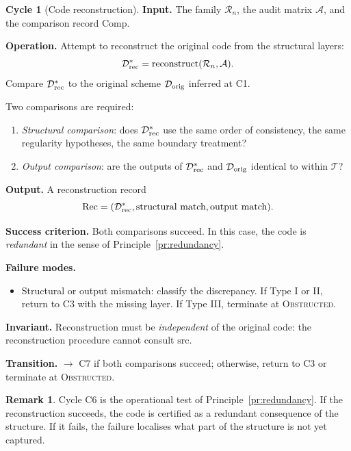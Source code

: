 \documentclass[11pt,a4paper]{article}
\theoremstyle{definition}
\newtheorem{cycle}{Cycle}[section]
\newtheorem{remark}[definition]{Remark}
\theoremstyle{plain}
\newcommand{\Rcal}{\mathcal{R}}
\newcommand{\Acal}{\mathcal{A}}
\newcommand{\Dcal}{\mathcal{D}}
\newcommand{\STOBSTR}{\textsc{Obstructed}}
\begin{document}
\begin{cycle}[Code reconstruction]\label{cy:c6}
\textbf{Input.} The family $\Rcal_n$, the audit matrix $\Acal$, and
the comparison record $\mathrm{Comp}$.

\medskip
\textbf{Operation.} Attempt to reconstruct the original code from
the structural layers:
\[
  \Dcal^\ast_{\rm rec} = \text{reconstruct}(\Rcal_n, \Acal).
\]
Compare $\Dcal^\ast_{\rm rec}$ to the original scheme
$\Dcal_{\rm orig}$ inferred at C1.

Two comparisons are required:
\begin{enumerate}[label=\arabic*.]
  \item \emph{Structural comparison}: does
        $\Dcal^\ast_{\rm rec}$ use the same order of consistency,
        the same regularity hypotheses, the same boundary treatment?
  \item \emph{Output comparison}: are the outputs of
        $\Dcal^\ast_{\rm rec}$ and $\Dcal_{\rm orig}$ identical to
        within $\mathcal{T}$?
\end{enumerate}

\medskip
\textbf{Output.} A reconstruction record
\[
  \mathrm{Rec} = (\Dcal^\ast_{\rm rec},
    \text{structural match}, \text{output match}).
\]

\medskip
\textbf{Success criterion.} Both comparisons succeed. In this
case, the code is \emph{redundant} in the sense of
Principle~\ref{pr:redundancy}.

\medskip
\textbf{Failure modes.}
\begin{itemize}
  \item Structural or output mismatch: classify the discrepancy.
        If Type I or II, return to C3 with the missing layer. If
        Type III, terminate at \STOBSTR.
\end{itemize}

\medskip
\textbf{Invariant.} Reconstruction must be \emph{independent} of
the original code: the reconstruction procedure cannot consult
$\mathrm{src}$.

\medskip
\textbf{Transition.} $\to$ C7 if both comparisons succeed;
otherwise, return to C3 or terminate at \STOBSTR.
\end{cycle}

\begin{remark}
Cycle C6 is the operational test of Principle~\ref{pr:redundancy}.
If the reconstruction succeeds, the code is certified as a
redundant consequence of the structure. If it fails, the failure
localises what part of the structure is not yet captured.
\end{remark}
\end{document}
